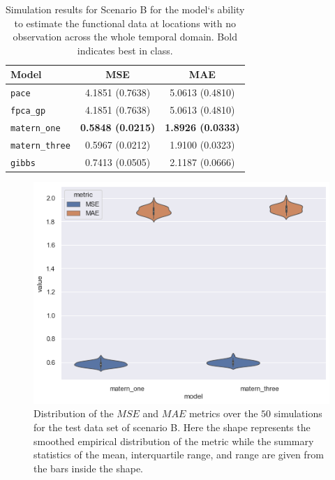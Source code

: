 \begin{table}
	\caption[Simulation results for Scenario B on test data]{Simulation results for Scenario B for the model`s ability to estimate the functional data at locations with no observation across the whole temporal domain. Bold indicates best in class.}
	\centering
	\label{tab:test_B}
	\begin{tabular}{lcc}
		\toprule
		\textbf{Model} & \textbf{MSE} & \textbf{MAE} \\
		\midrule
		\verb*|pace| & 4.1851 (0.7638) & 5.0613	(0.4810) \\
		\verb*|fpca_gp| & 4.1851 (0.7638) & 5.0613 (0.4810) \\
		\verb*|matern_one| & \textbf{0.5848	(0.0215)} & \textbf{1.8926	(0.0333)} \\
		\verb*|matern_three| & 0.5967 (0.0212) & 1.9100	(0.0323) \\
		\verb*|gibbs| & 0.7413 (0.0505) & 2.1187 (0.0666)\\
		\bottomrule
	\end{tabular}
\end{table}

\begin{figure}
	\centering
	\includegraphics[width=\textwidth]{comp_test_B}
	\caption[Distribution of the $MSE$ and $MAE$ metrics over the $50$ simulations for the test data set of scenario B.]{Distribution of the $MSE$ and $MAE$ metrics over the $50$ simulations for the test data set of scenario B. Here the shape represents the smoothed empirical distribution of the metric while the summary statistics of the mean, interquartile range, and range are given from the bars inside the shape.}
	\label{fig:test_comp_B}
\end{figure}

